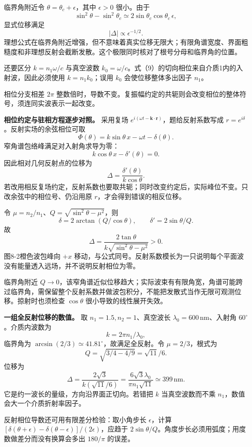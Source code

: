 \documentclass[12pt,a4paper,UTF8]{ctexart}
\begin{document}
临界角附近令 \(\theta=\theta_c+\epsilon\)，其中 \(\epsilon>0\)
很小。由于 \[
\sin^2\theta-\sin^2\theta_c
\simeq2\sin\theta_c\cos\theta_c\,\epsilon,
\] 显式位移满足 \[
|\Delta|\propto\epsilon^{-1/2}.
\]
理想公式在临界角附近增强，但不意味着真实位移无限大；有限角谱宽度、界面粗糙度和非理想反射会截断发散。这个极限同时核对了根号分母和临界角的位置。

还要区分 \(k=n_1\omega/c\) 与真空波数
\(k_0=\omega/c\)。式（9）的切向相位来自介质1内的入射波，因此必须使用
\(k=n_1k_0\)；误用 \(k_0\) 会使位移整体多出因子 \(n_1\)。

相位分支相差 \(2\pi\)
整数倍时，导数不变。复振幅约定的共轭则会改变相位的整体符号，须连同实波表示一起改变。

\textbf{相位约定与驻相方程逐步对照。} 采用复场
\(e^{i(\omega t-\bm k\cdot\bm r)}\)，题给反射系数写成
\(r=e^{i\delta}\)。反射实场的余弦相位可取 \[
\Phi(\theta)=k\sin\theta\,x-\omega t-\delta(\theta).
\] 窄角谱包络峰满足对入射角求导为零： \[
k\cos\theta\,x-\delta'(\theta)=0.
\] 因此相对几何反射点的位移为 \[
\Delta=\frac{\delta'(\theta)}{k\cos\theta}.
\]
若改用相反复场约定，反射系数也要取共轭；同时改变约定后，实际峰位不变。只改余弦中的相位号、仍沿用原
\(r\)，才会得到错误的相反位移。

令 \(\mu=n_2/n_1\)、\(Q=\sqrt{\sin^2\theta-\mu^2}\)，则 \[
\delta=2\arctan(Q/\cos\theta),\qquad
\delta'=2\sin\theta/Q.
\] 故 \[
\Delta=\frac{2\tan\theta}{k\sqrt{\sin^2\theta-\mu^2}}>0.
\] 图8-2橙色波包峰向 \(+x\)
移动，与公式同号。反射系数模长为一只说明每个平面波没有能量透入远场，并不说明反射相位为零。

临界角附近
\(Q\to0\)，该窄角谱近似位移趋大；实际波束有有限角宽，角谱可能跨过临界角，需保留整个反射系数并做波包积分，不能把发散式当作无限可观测位移。掠射时也须检查
\(\cos\theta\) 很小导致的线性展开失效。

\textbf{一组全反射位移的数值。} 取 \(n_1=1.5,n_2=1\)、真空波长
\(\lambda_0=600\,\mathrm{nm}\)、入射角 \(60^\circ\)。介质内波数为 \[
k=2\pi n_1/\lambda_0,
\] 临界角为 \(\arcsin(2/3)\simeq41.81^\circ\)，故满足全反射。令
\(\mu=2/3\)，根式为 \[
Q=\sqrt{3/4-4/9}=\sqrt{11}/6.
\] 位移为 \[
\Delta=\frac{2\sqrt3}{k(\sqrt{11}/6)}
=\frac{6\sqrt3\lambda_0}{\pi n_1\sqrt{11}}
\simeq399\,\mathrm{nm}.
\] 它是约一波长的量级，方向沿界面正切向。若错把 \(k\) 当真空波数而不乘
\(n_1\)，数值会大一个介质折射率因子。

反射相位导数还可用有限差分检验：取小角步长 \(\epsilon\)，计算
\([\delta(\theta+\epsilon)-\delta(\theta-\epsilon)]/(2\epsilon)\)，应趋于
\(2\sin\theta/Q\)。角度步长必须用弧度；用度数做差分而没有换算会多出
\(180/\pi\) 的误差。
\end{document}
